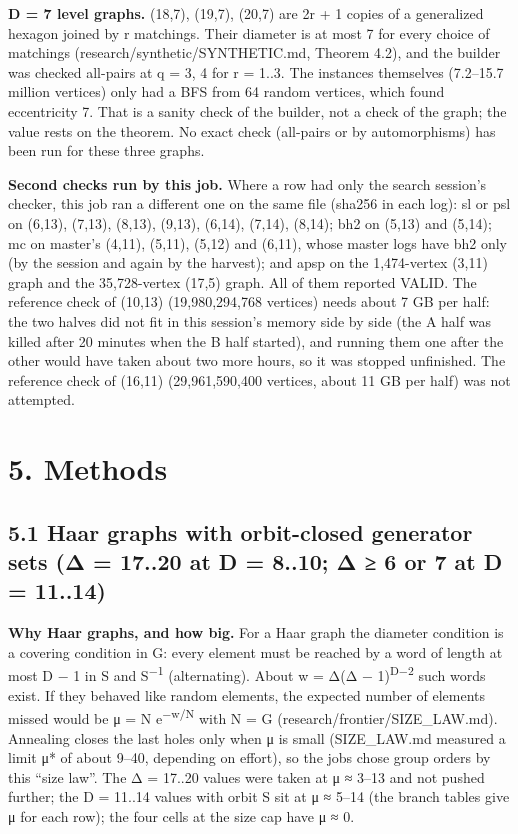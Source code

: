 \documentclass[
  10pt,
]{article}
\begin{document}
\textbf{D = 7 level graphs.} (18,7), (19,7), (20,7) are 2r + 1 copies of a generalized hexagon joined by r matchings.
Their diameter is at most 7 for every choice of matchings (research/synthetic/SYNTHETIC.md, Theorem 4.2), and the
builder was checked all-pairs at q = 3, 4 for r = 1..3. The instances themselves (7.2--15.7 million vertices) only had
a BFS from 64 random vertices, which found eccentricity 7. That is a sanity check of the builder, not a check of the
graph; the value rests on the theorem. No exact check (all-pairs or by automorphisms) has been run for these three
graphs.

\textbf{Second checks run by this job.} Where a row had only the search session's checker, this job ran a different
one on the same file (sha256 in each log): sl or psl on (6,13), (7,13), (8,13), (9,13), (6,14), (7,14), (8,14); bh2 on
(5,13) and (5,14); mc on master's (4,11), (5,11), (5,12) and (6,11), whose master logs have bh2 only (by the session
and again by the harvest); and apsp on the 1,474-vertex (3,11) graph and the 35,728-vertex (17,5) graph. All of them
reported VALID. The reference check of (10,13) (19,980,294,768 vertices) needs about 7 GB per half: the two halves did
not fit in this session's memory side by side (the A half was killed after 20 minutes when the B half started), and
running them one after the other would have taken about two more hours, so it was stopped unfinished. The reference
check of (16,11) (29,961,590,400 vertices, about 11 GB per half) was not attempted.

\hypertarget{methods}{%
\section{5. Methods}\label{methods}}

\hypertarget{haar-graphs-with-orbit-closed-generator-sets-ux3b4-17..20-at-d-8..10-ux3b4-6-or-7-at-d-11..14}{%
\subsection{5.1 Haar graphs with orbit-closed generator sets (Δ = 17..20 at D = 8..10; Δ ≥ 6 or 7 at D =
11..14)}\label{haar-graphs-with-orbit-closed-generator-sets-ux3b4-17..20-at-d-8..10-ux3b4-6-or-7-at-d-11..14}}

\textbf{Why Haar graphs, and how big.} For a Haar graph the diameter condition is a covering condition in G: every
element must be reached by a word of length at most D − 1 in S and S\textsuperscript{−1} (alternating). About w = Δ(Δ
− 1)\textsuperscript{D−2} such words exist. If they behaved like random elements, the expected number of elements
missed would be μ = N e\textsuperscript{−w/N} with N = \textbar G\textbar{} (research/frontier/SIZE\_LAW.md).
Annealing closes the last holes only when μ is small (SIZE\_LAW.md measured a limit μ* of about 9--40, depending on
effort), so the jobs chose group orders by this ``size law''. The Δ = 17..20 values were taken at μ ≈ 3--13 and not
pushed further; the D = 11..14 values with orbit S sit at μ ≈ 5--14 (the branch tables give μ for each row); the four
cells at the size cap have μ ≈ 0.
\end{document}

